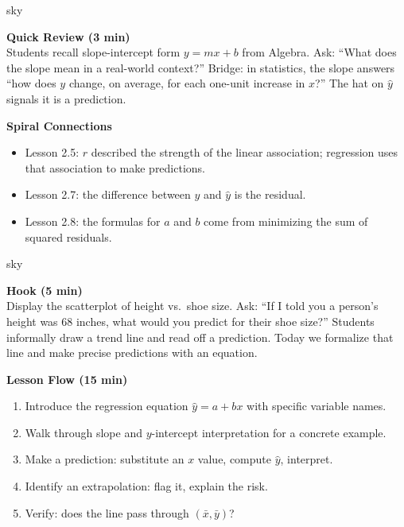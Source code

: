 \documentclass[10pt]{article}
\begin{document}
\begin{skillbox}{sky}
\begin{minipage}[t]{0.48\linewidth}
    \textbf{Quick Review (3 min)}\\
    Students recall slope-intercept form $y = mx + b$ from Algebra. Ask: ``What does the slope mean in a real-world context?'' Bridge: in statistics, the slope answers ``how does $y$ change, on average, for each one-unit increase in $x$?'' The hat on $\hat{y}$ signals it is a prediction.
\end{minipage}
\hfill
\begin{minipage}[t]{0.48\linewidth}
    \textbf{Spiral Connections}
    \begin{itemize}
        \item Lesson 2.5: $r$ described the strength of the linear association; regression uses that association to make predictions.
        \item Lesson 2.7: the difference between $y$ and $\hat{y}$ is the residual.
        \item Lesson 2.8: the formulas for $a$ and $b$ come from minimizing the sum of squared residuals.
    \end{itemize}
\end{minipage}
\end{skillbox}

\begin{skillbox}{sky}
\begin{minipage}[t]{0.48\linewidth}
    \textbf{Hook (5 min)}\\
    Display the scatterplot of height vs.\ shoe size. Ask: ``If I told you a person's height was 68 inches, what would you predict for their shoe size?'' Students informally draw a trend line and read off a prediction. Today we formalize that line and make precise predictions with an equation.
\end{minipage}
\hfill
\begin{minipage}[t]{0.48\linewidth}
    \textbf{Lesson Flow (15 min)}
    \begin{enumerate}
        \item Introduce the regression equation $\hat{y} = a + bx$ with specific variable names.
        \item Walk through slope and $y$-intercept interpretation for a concrete example.
        \item Make a prediction: substitute an $x$ value, compute $\hat{y}$, interpret.
        \item Identify an extrapolation: flag it, explain the risk.
        \item Verify: does the line pass through $(\bar{x}, \bar{y})$?
    \end{enumerate}
\end{minipage}
\end{skillbox}
\end{document}

